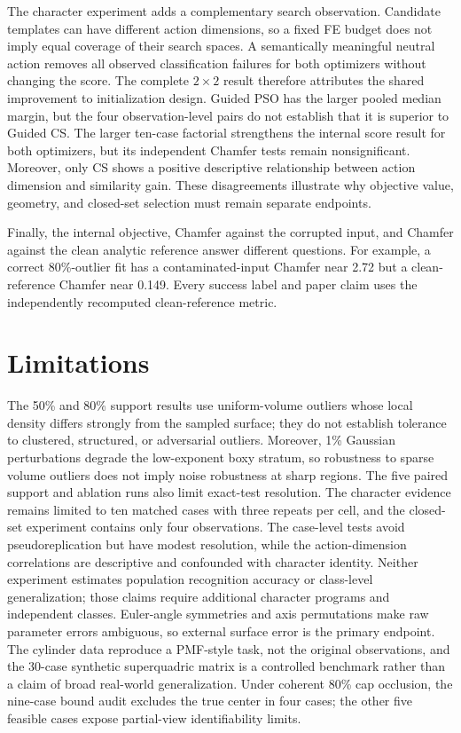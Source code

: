 \documentclass[conference]{IEEEtran}
\begin{document}
The character experiment adds a complementary search observation.  Candidate
templates can have different action dimensions, so a fixed FE budget does not
imply equal coverage of their search spaces.  A semantically meaningful neutral
action removes all observed classification failures for both optimizers without
changing the score.  The complete $2\times2$ result therefore attributes the
shared improvement to initialization design.  Guided PSO has the larger pooled
median margin, but the four observation-level pairs do not establish that it is
superior to Guided CS.  The larger ten-case factorial strengthens the internal
score result for both optimizers, but its independent Chamfer tests remain
nonsignificant.  Moreover, only CS shows a positive descriptive relationship
between action dimension and similarity gain.  These disagreements illustrate
why objective value, geometry, and closed-set selection must remain separate
endpoints.

Finally, the internal objective, Chamfer against the corrupted input, and
Chamfer against the clean analytic reference answer different questions.  For
example, a correct 80\%-outlier fit has a contaminated-input Chamfer near 2.72
but a clean-reference Chamfer near 0.149.  Every success label and paper claim
uses the independently recomputed clean-reference metric.

\section{Limitations}
The 50\% and 80\% support results use uniform-volume outliers whose local
density differs strongly from the sampled surface; they do not establish
tolerance to clustered, structured, or adversarial outliers.  Moreover, 1\%
Gaussian perturbations degrade the low-exponent boxy stratum, so robustness to
sparse volume outliers does not imply noise robustness at sharp regions.  The
five paired support and ablation runs also limit exact-test resolution.
The character evidence remains limited to ten matched cases with three repeats
per cell, and the closed-set experiment contains only four observations.  The
case-level tests avoid pseudoreplication but have modest resolution, while the
action-dimension correlations are descriptive and confounded with character
identity.  Neither experiment estimates population recognition accuracy or
class-level generalization; those claims require additional character programs
and independent classes.
Euler-angle symmetries and axis permutations make raw parameter errors
ambiguous, so external surface error is the primary endpoint.  The cylinder
data reproduce a PMF-style task, not the original observations, and the
30-case synthetic superquadric matrix is a controlled benchmark rather than a
claim of broad real-world generalization.  Under coherent 80\% cap occlusion,
the nine-case bound audit excludes the true center in four cases; the other
five feasible cases expose partial-view identifiability limits.
\end{document}
